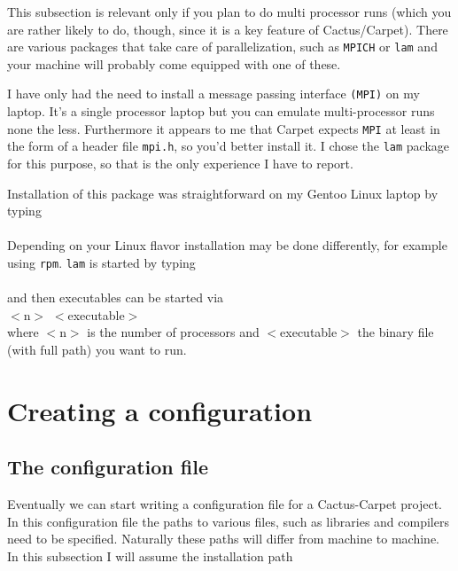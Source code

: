 \documentclass[11pt]{article}
\numberwithin{equation}{section}
\begin{document}
This subsection is relevant only if you plan to do multi processor runs
(which you are rather likely to do, though, since it is a key feature of
Cactus/Carpet). There are various packages that take care of
parallelization, such as {\tt MPICH} or {\tt lam} and your machine
will probably come equipped with one of these.

I have only had the need to install a message passing interface
{\tt (MPI)} on my laptop. It's a single processor laptop but
you can emulate multi-processor runs none the less. Furthermore
it appears to me that Carpet expects {\tt MPI} at least in the
form of a header file {\tt mpi.h}, so you'd better install it.
I chose the {\tt lam} package for this
purpose, so that is the only experience I have to report.

Installation of this package was straightforward on my Gentoo
Linux laptop by typing\\

\hspace{1cm}{\tt emerge lam-mpi}\\

Depending on your Linux flavor installation may be done differently,
for example using {\tt rpm}. {\tt lam} is started by typing\\

\hspace{1cm}{\tt lamboot}\\

and then executables can be started via\\

\hspace{1cm}{\tt mpirun -np} $<$n$>$ $<$executable$>$\\

where $<$n$>$ is the number of processors and $<$executable$>$
the binary file (with full path) you want to run.


\section{Creating a configuration}

\subsection{The configuration file}

Eventually we can start writing a configuration file for a Cactus-Carpet
project. In this configuration file the paths to various files, such as
libraries and compilers need to be specified. Naturally these paths will
differ from machine to machine. In this subsection I will assume
the installation path
\end{document}
